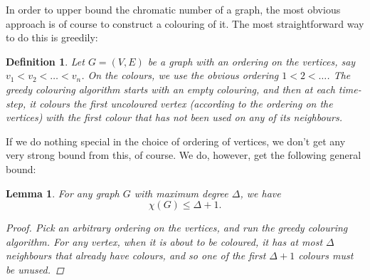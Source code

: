 \documentclass[nobib]{tufte-handout}
\newtheorem{definition}{Definition}
\newtheorem{lemma}{Lemma}
\begin{document}
In order to upper bound the chromatic number of a graph, the most obvious approach is of course to construct a colouring of it. The most straightforward way to do this is greedily:

\begin{definition}
  Let $G = (V,E)$ be a graph with an ordering on the vertices, say $v_1 < v_2 <\ldots<v_n$. On the colours, we use the obvious ordering $1 < 2 < \ldots$. The \emph{greedy colouring algorithm} starts with an empty colouring, and then at each time-step, it colours the first uncoloured vertex (according to the ordering on the vertices) with the first colour that has not been used on any of its neighbours.
\end{definition}

If we do nothing special in the choice of ordering of vertices, we don't get any very strong bound from this, of course. We do, however, get the following general bound:

\begin{lemma}\label{lemma:trivial_chi_upper_bound}
  For any graph $G$ with maximum degree $\Delta$, we have
  $$\chi(G) \leq \Delta + 1.$$

  \begin{proof}
    Pick an arbitrary ordering on the vertices, and run the greedy colouring algorithm. For any vertex, when it is about to be coloured, it has at most $\Delta$ neighbours that already have colours, and so one of the first $\Delta + 1$ colours must be unused.
  \end{proof}
\end{lemma}
\end{document}
